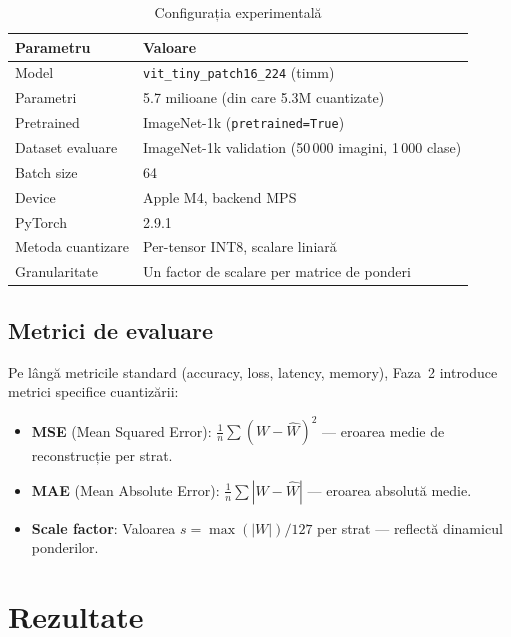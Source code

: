 \documentclass[12pt,a4paper]{article}
\begin{document}
\begin{table}[H]
  \centering
  \caption{Configurația experimentală}
  \begin{tabular}{ll}
    \toprule
    \textbf{Parametru} & \textbf{Valoare} \\
    \midrule
    Model             & \texttt{vit\_tiny\_patch16\_224} (timm) \\
    Parametri         & 5.7 milioane (din care 5.3M cuantizate) \\
    Pretrained        & ImageNet-1k (\texttt{pretrained=True}) \\
    Dataset evaluare  & ImageNet-1k validation (50\,000 imagini, 1\,000 clase) \\
    Batch size        & 64 \\
    Device            & Apple M4, backend MPS \\
    PyTorch           & 2.9.1 \\
    Metoda cuantizare & Per-tensor INT8, scalare liniară \\
    Granularitate     & Un factor de scalare per matrice de ponderi \\
    \bottomrule
  \end{tabular}
  \label{tab:config_int8}
\end{table}

\subsection{Metrici de evaluare}

Pe lângă metricile standard (accuracy, loss, latency, memory), Faza~2
introduce metrici specifice cuantizării:

\begin{itemize}
  \item \textbf{MSE} (Mean Squared Error): $\frac{1}{n}\sum(W - \hat{W})^2$
    --- eroarea medie de reconstrucție per strat.
  \item \textbf{MAE} (Mean Absolute Error): $\frac{1}{n}\sum|W - \hat{W}|$
    --- eroarea absolută medie.
  \item \textbf{Scale factor}: Valoarea $s = \max(|W|)/127$ per strat ---
    reflectă dinamicul ponderilor.
\end{itemize}

\section{Rezultate}
\end{document}
